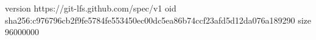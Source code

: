 version https://git-lfs.github.com/spec/v1
oid sha256:c976796cb2f9fe5784fe553450ec00dc5ea86b74ccf23afd5d12da076a189290
size 96000000
